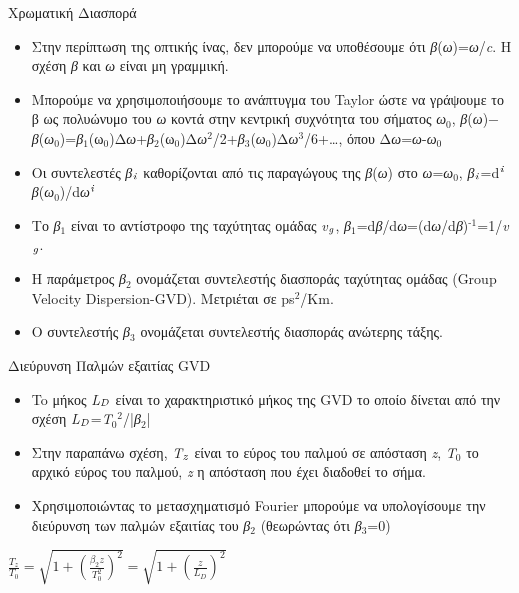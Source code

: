 \documentclass[11pt,aspectratio=169]{beamer}
\begin{document}
\begin{frame}[shrink=20,t]{Χρωματική Διασπορά}
\begin{itemize}
\item Στην περίπτωση της οπτικής ίνας, δεν μπορούμε να υποθέσουμε ότι \textit{β}(\textit{ω})=\textit{ω}/\textit{c}. Η σχέση \textit{β} και \textit{ω} είναι μη γραμμική.
\item Μπορούμε να χρησιμοποιήσουμε το ανάπτυγμα του Taylor ώστε να γράψουμε το β ως πολυώνυμο του \textit{ω} κοντά στην κεντρική συχνότητα του σήματος \textit{ω}$_{\text{0}}$, \textit{β}(\textit{ω})\ensuremath{-}\textit{β}(\textit{ω}$_{\text{0}}$)=\textit{β}$_{\text{1}}$(ω$_{\text{0}}$)Δ\textit{ω}+\textit{β}$_{\text{2}}$(ω$_{\text{0}}$)Δ\textit{ω}$^{\text{2}}$/2+\textit{β}$_{\text{3}}$(\textit{ω}$_{\text{0}}$)Δ\textit{ω}$^{\text{3}}$/6+…, όπου Δ\textit{ω}=\textit{ω}-\textit{ω}$_{\text{0}}$
\item Οι συντελεστές \textit{β}$_{\text{\textit{i}}}$ καθορίζονται από τις παραγώγους της \textit{β}(\textit{ω}) στο \textit{ω}=\textit{ω}$_{\text{0}}$, \textit{β}$_{\text{\textit{i}}}$=d$^{\text{\textit{i}}}$\textit{β}(\textit{ω}$_{\text{0}}$)/d\textit{ω}$^{\text{\textit{i}}}$
\item Το \textit{β}$_{\text{1}}$ είναι το αντίστροφο της ταχύτητας ομάδας \textit{v}$_{\text{\textit{g}}}$, \textit{β}$_{\text{1}}$=d\textit{β}/d\textit{ω}=(d\textit{ω}/d\textit{β})$^{\text{-1}}$=1/\textit{v}$_{\text{\textit{g}}}$.
\item Η παράμετρος \textit{β}$_{\text{2}}$ ονομάζεται συντελεστής διασποράς ταχύτητας ομάδας (Group Velocity Dispersion-GVD). Μετριέται σε ps$^{\text{2}}$/Km.
\item Ο συντελεστής \textit{β}$_{\text{3}}$ ονομάζεται συντελεστής διασποράς ανώτερης τάξης.
\end{itemize}
\end{frame}

\begin{frame}[shrink=20,t]{Διεύρυνση Παλμών εξαιτίας GVD}
\begin{itemize}
\item To μήκος \textit{L}$_{\text{\textit{D}}}$ είναι το χαρακτηριστικό μήκος της GVD το οποίο δίνεται από την σχέση \textit{L}$_{\text{\textit{D}}}$=\textit{T}$_{\text{0}}$$^{\text{2}}$/|\textit{β}$_{\text{2}}$|
\item Στην παραπάνω σχέση, \textit{T}$_{\text{\textit{z}}}$ είναι το εύρος του παλμού σε απόσταση \textit{z}, \textit{T}$_{\text{0}}$ το αρχικό εύρος του παλμού, \textit{z} η απόσταση που έχει διαδοθεί το σήμα.
\end{itemize}
\medskip
\begin{itemize}
\item Χρησιμοποιώντας το μετασχηματισμό Fourier μπορούμε να υπολογίσουμε την διεύρυνση των παλμών εξαιτίας του \textit{β}$_{\text{2}}$ (θεωρώντας ότι \textit{β}$_{\text{3}}$=0)
\end{itemize}
\begin{center}
$\displaystyle \frac{T_{z}}{T_{0}}=\sqrt{1+\left(\frac{\beta_{2}z}{T_{0}^{2}}\right)^{2}}=\sqrt{1+\left(\frac{z}{L_{D}}\right)^{2}}$\\[0.6ex]
\end{center}
\end{frame}
\end{document}
